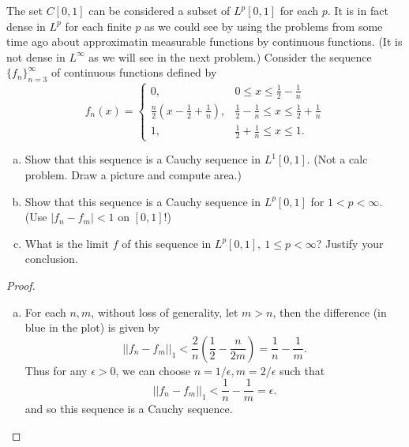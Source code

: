 \begin{pblm}%
	The set $C[0,1]$ can be considered a subset of $L^p[0,1]$ for each $p$. It is in 
	fact dense in $L^p$ for each finite $p$ as we could see by using the problems from 
	some time ago about approximatin measurable functions by continuous functions. (It 
	is not dense in $L^\infty$ as we will see in the next problem.) Consider the sequence 
	$\{f_n\}_{n=3}^\infty$ of continuous functions defined by 
	\begin{equation*}
		f_n(x) = \left\{
		\begin{matrix}
		0, & 0 \le x \le \frac{1}{2} - \frac{1}{n}\\
		\frac{n}{2}\left(x - \frac{1}{2} + \frac{1}{n}\right), & \frac{1}{2} - \frac{1}{n} \le x \le \frac{1}{2} + \frac{1}{n}\\
		1, & \frac{1}{2} + \frac{1}{n} \le x \le 1.
		\end{matrix}
		\right.
	\end{equation*}
	\begin{enumerate}[(a)]
		\item Show that this sequence is a Cauchy sequence in $L^1[0,1]$. (Not a 
			calc problem. Draw a picture and compute area.)
		\item Show that this sequence is a Cauchy sequence in $L^p[0,1]$ for $1 < p < \infty$. 
			(Use $|f_n - f_m| < 1$ on $[0,1]$!)
		\item What is the limit $f$ of this sequence in $L^p[0,1],~1\le p<\infty$? 
			Justify your conclusion. 
	\end{enumerate}
\begin{proof}
	\begin{enumerate}[(a)]
		\item For each $n, m$, without loss of generality, let $m > n$, then 
			the difference (in blue in the plot) is given by 
			\begin{equation*}||f_n - f_m||_1 < \frac{2}{n}\left(\frac{1}{2} - 
			\frac{n}{2m}\right) = \frac{1}{n} - \frac{1}{m}.\end{equation*}
			Thus for any $\epsilon > 0$, we can choose $n = 1/\epsilon, m = 2/\epsilon$ 
			such that \begin{equation*}||f_n - f_m||_1 < \frac{1}{n} - \frac{1}{m} = \epsilon. \end{equation*}
			and so this sequence is a Cauchy sequence. 
			\begin{center}
			\resizebox{0.38\textwidth}{!}{
			\begin{tikzpicture}
			\begin{axis}[legend pos=north west, legend style={fill=gray!10}, ytick={0, 1},xtick={0,0.5,1}]

\end{axis}
\end{tikzpicture}}
\end{center}
\end{enumerate}
\end{proof}
\end{pblm}
